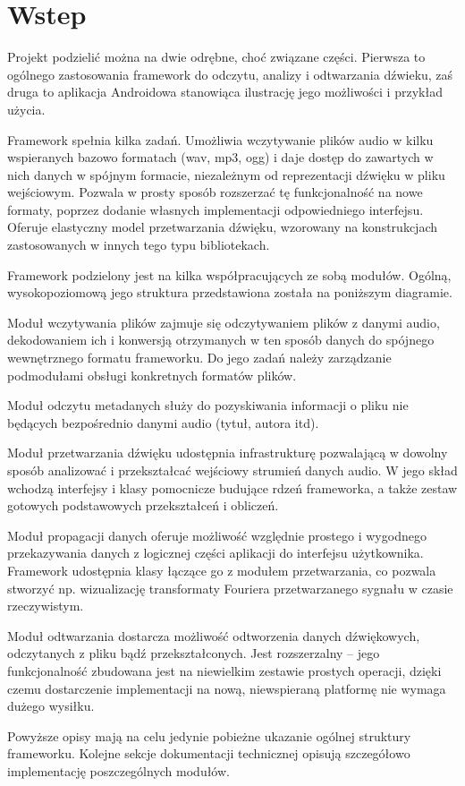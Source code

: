 
\chapter{Wstep}

Projekt podzielić można na dwie odrębne, choć związane części. Pierwsza to ogólnego zastosowania
framework do odczytu, analizy i odtwarzania dźwieku, zaś druga to aplikacja Androidowa stanowiąca
ilustrację jego możliwości i przykład użycia.

Framework spełnia kilka zadań. Umożliwia wczytywanie plików audio w kilku wspieranych bazowo
formatach (wav, mp3, ogg) i daje dostęp do zawartych w nich danych w spójnym formacie, niezależnym
od reprezentacji dźwięku w pliku wejściowym. Pozwala w prosty sposób rozszerzać tę funkcjonalność na
nowe formaty, poprzez dodanie własnych implementacji odpowiedniego interfejsu. Oferuje elastyczny
model przetwarzania dźwięku, wzorowany na konstrukcjach zastosowanych w innych tego typu
bibliotekach.

Framework podzielony jest na kilka współpracujących ze sobą modułów. Ogólną, wysokopoziomową jego
struktura przedstawiona została na poniższym diagramie.


Moduł wczytywania plików zajmuje się odczytywaniem plików z danymi audio, dekodowaniem ich i
konwersją otrzymanych w ten sposób danych do spójnego wewnętrznego formatu frameworku. Do jego zadań
należy zarządzanie podmodułami obsługi konkretnych formatów plików.

Moduł odczytu metadanych służy do pozyskiwania informacji o pliku nie będących bezpośrednio danymi
audio (tytuł, autora itd). 

Moduł przetwarzania dźwięku udostępnia infrastrukturę pozwalającą w dowolny sposób analizować i
przekształcać wejściowy strumień danych audio. W jego skład wchodzą interfejsy i klasy pomocnicze
budujące rdzeń frameworka, a także zestaw gotowych podstawowych przekształceń i obliczeń.

Moduł propagacji danych oferuje możliwość względnie prostego i wygodnego przekazywania danych z
logicznej części aplikacji do interfejsu użytkownika. Framework udostępnia klasy łączące go z
modułem przetwarzania, co pozwala stworzyć np. wizualizację transformaty Fouriera przetwarzanego
sygnału w czasie rzeczywistym.

Moduł odtwarzania dostarcza możliwość odtworzenia danych dźwiękowych, odczytanych z pliku bądź
przekształconych. Jest rozszerzalny -- jego funkcjonalność zbudowana jest na niewielkim zestawie
prostych operacji, dzięki czemu dostarczenie implementacji na nową, niewspieraną platformę nie
wymaga dużego wysiłku.

Powyższe opisy mają na celu jedynie pobieżne ukazanie ogólnej struktury frameworku. Kolejne sekcje
dokumentacji technicznej opisują szczegółowo implementację poszczególnych modułów.
